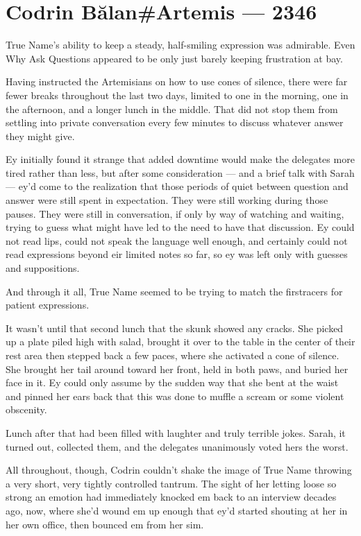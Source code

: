 \hypertarget{codrin-bux103lanartemis-2346}{%
\chapter{Codrin Bălan\#Artemis — 2346}\label{codrin-bux103lanartemis-2346}}

True Name's ability to keep a steady, half-smiling expression was admirable. Even Why Ask Questions appeared to be only just barely keeping frustration at bay.

Having instructed the Artemisians on how to use cones of silence, there were far fewer breaks throughout the last two days, limited to one in the morning, one in the afternoon, and a longer lunch in the middle. That did not stop them from settling into private conversation every few minutes to discuss whatever answer they might give.

Ey initially found it strange that added downtime would make the delegates more tired rather than less, but after some consideration — and a brief talk with Sarah — ey'd come to the realization that those periods of quiet between question and answer were still spent in expectation. They were still working during those pauses. They were still in conversation, if only by way of watching and waiting, trying to guess what might have led to the need to have that discussion. Ey could not read lips, could not speak the language well enough, and certainly could not read expressions beyond eir limited notes so far, so ey was left only with guesses and suppositions.

And through it all, True Name seemed to be trying to match the firstracers for patient expressions.

It wasn't until that second lunch that the skunk showed any cracks. She picked up a plate piled high with salad, brought it over to the table in the center of their rest area then stepped back a few paces, where she activated a cone of silence. She brought her tail around toward her front, held in both paws, and buried her face in it. Ey could only assume by the sudden way that she bent at the waist and pinned her ears back that this was done to muffle a scream or some violent obscenity.

Lunch after that had been filled with laughter and truly terrible jokes. Sarah, it turned out, collected them, and the delegates unanimously voted hers the worst.

All throughout, though, Codrin couldn't shake the image of True Name throwing a very short, very tightly controlled tantrum. The sight of her letting loose so strong an emotion had immediately knocked em back to an interview decades ago, now, where she'd wound em up enough that ey'd started shouting at her in her own office, then bounced em from her sim.

